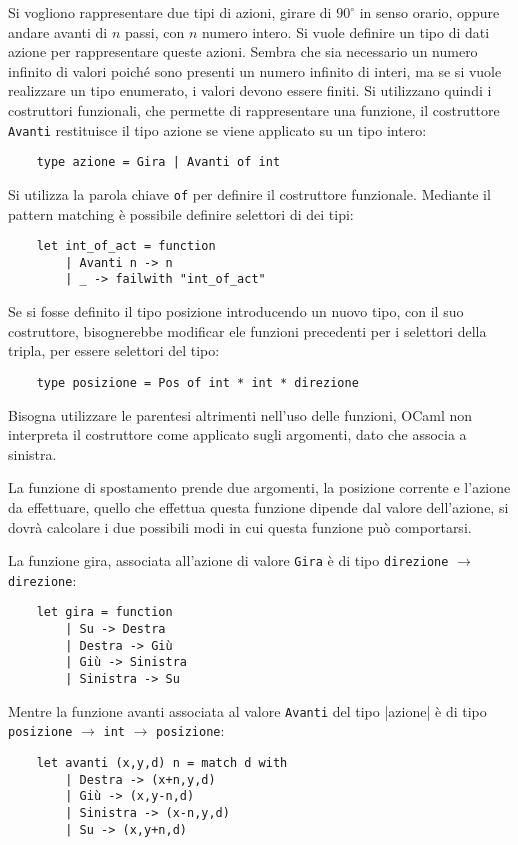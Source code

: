 \documentclass{article}
\numberwithin{equation}{subsection}
\begin{document}
Si vogliono rappresentare due tipi di azioni, girare di $90^\circ$ in senso orario, oppure andare avanti di $n$ passi, con $n$ numero intero. Si vuole definire un tipo di dati azione per rappresentare queste azioni. Sembra che sia necessario un numero infinito di valori poiché sono presenti un numero infinito di interi, ma se si vuole realizzare un tipo enumerato, i valori devono essere finiti. Si utilizzano quindi i costruttori funzionali, che permette di rappresentare una funzione, il costruttore \verb|Avanti| restituisce il tipo azione se viene applicato su un tipo intero:
\begin{verbatim}
    type azione = Gira | Avanti of int
\end{verbatim}
Si utilizza la parola chiave \verb|of| per definire il costruttore funzionale. Mediante il pattern matching è possibile definire selettori di dei tipi:
\begin{verbatim}
    let int_of_act = function 
        | Avanti n -> n
        | _ -> failwith "int_of_act"
\end{verbatim}
Se si fosse definito il tipo posizione introducendo un nuovo tipo, con il suo costruttore, bisognerebbe modificar ele funzioni precedenti per i selettori della tripla, per essere selettori del tipo:
\begin{verbatim}
    type posizione = Pos of int * int * direzione
\end{verbatim}

Bisogna utilizzare le parentesi altrimenti nell'uso delle funzioni, OCaml non interpreta il costruttore come applicato sugli argomenti, dato che associa a sinistra. 

La funzione di spostamento prende due argomenti, la posizione corrente e l'azione da effettuare, quello che effettua questa funzione dipende dal valore dell'azione, si dovrà calcolare i due possibili modi in cui questa funzione può comportarsi. 


La funzione gira, associata all'azione di valore \verb|Gira| è di tipo \verb|direzione| $\rightarrow$ \verb|direzione|:
\begin{verbatim}
    let gira = function
        | Su -> Destra
        | Destra -> Giù
        | Giù -> Sinistra
        | Sinistra -> Su
\end{verbatim}

Mentre la funzione avanti associata al valore \verb|Avanti| del tipo |azione| è di tipo \verb|posizione| $\rightarrow$ \verb|int| $\rightarrow$ \verb|posizione|:
\begin{verbatim}
    let avanti (x,y,d) n = match d with
        | Destra -> (x+n,y,d)
        | Giù -> (x,y-n,d)
        | Sinistra -> (x-n,y,d)
        | Su -> (x,y+n,d)
\end{verbatim}
\end{document}
